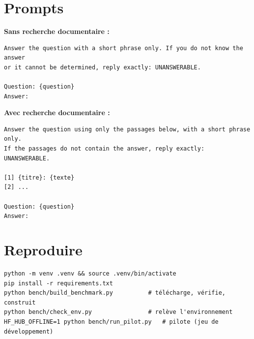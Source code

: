 \documentclass[11pt,a4paper]{article}
\begin{document}
\appendix
\section{Prompts}\label{ann:prompts}
\textbf{Sans recherche documentaire :}
\begin{small}
\begin{verbatim}
Answer the question with a short phrase only. If you do not know the answer
or it cannot be determined, reply exactly: UNANSWERABLE.

Question: {question}
Answer:
\end{verbatim}
\end{small}
\textbf{Avec recherche documentaire :}
\begin{small}
\begin{verbatim}
Answer the question using only the passages below, with a short phrase only.
If the passages do not contain the answer, reply exactly: UNANSWERABLE.

[1] {titre}: {texte}
[2] ...

Question: {question}
Answer:
\end{verbatim}
\end{small}

\section{Reproduire}\label{ann:reproduire}
\begin{small}
\begin{verbatim}
python -m venv .venv && source .venv/bin/activate
pip install -r requirements.txt
python bench/build_benchmark.py          # télécharge, vérifie, construit
python bench/check_env.py                # relève l'environnement
HF_HUB_OFFLINE=1 python bench/run_pilot.py   # pilote (jeu de développement)
\end{verbatim}
\end{small}



\end{document}
